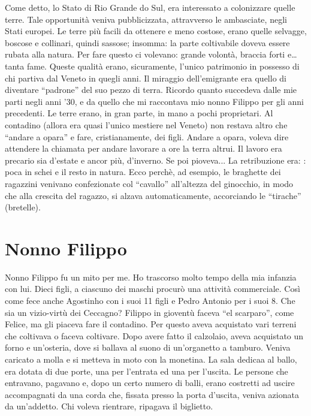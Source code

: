 \documentclass[a4paper,10pt]{book}
\begin{document}
Come detto, lo Stato di Rio Grande do Sul, era interessato a colonizzare quelle terre. Tale opportunità veniva pubblicizzata, attravverso le ambasciate, negli Stati europei.\newline
Le terre più facili da ottenere e meno costose, erano quelle selvagge, boscose e collinari, quindi sassose; insomma: la parte coltivabile doveva essere rubata alla natura. Per fare questo ci volevano: grande volontà, braccia forti e…   tanta fame. Queste qualità erano, sicuramente, l’unico patrimonio in possesso di chi partiva dal Veneto in quegli anni. Il miraggio dell’emigrante era quello di diventare “padrone” del suo pezzo di terra.\newline
Ricordo quanto succedeva dalle mie parti negli anni ’30, e da quello che mi raccontava mio nonno Filippo per gli anni precedenti. Le terre erano, in gran parte, in mano a pochi proprietari. Al contadino (allora era quasi l’unico mestiere nel Veneto) non restava altro che “andare a opara” e fare, cristianamente, dei figli. Andare a opara, voleva dire attendere la chiamata per andare lavorare a ore la terra altrui. Il lavoro era precario sia d’estate e ancor più, d’inverno. Se poi pioveva...\newline
La retribuzione era: : poca in schei e il resto in natura. Ecco perchè, ad esempio, le braghette dei ragazzini venivano confezionate col “cavallo” all’altezza del ginocchio, in modo che alla crescita del ragazzo, si alzava automaticamente, accorciando le “tirache” (bretelle).

\section*{Nonno Filippo}

Nonno Filippo fu un mito per me. Ho trascorso molto tempo della mia infanzia con lui.\newline
Dieci figli, a ciascuno dei maschi procurò una attività commerciale. Così come  fece anche Agostinho con i suoi 11 figli e Pedro Antonio per i suoi 8. Che sia un vizio-virtù dei Ceccagno?  
Filippo in gioventù faceva “el scarparo”, come Felice, ma gli piaceva fare il contadino. Per questo aveva acquistato vari terreni che coltivava o faceva coltivare. Dopo avere fatto il calzolaio, aveva acquistato un forno e un’osteria, dove si ballava al suono di un’organetto a tamburo. Veniva caricato  a molla e si metteva in moto con la monetina. La sala dedicaa al ballo, era dotata di due porte, una per l’entrata ed una per l’uscita. Le persone che entravano, pagavano e, dopo un certo numero di balli, erano costretti ad uscire accompagnati da una corda che, fissata presso la porta d’uscita, veniva azionata  da un’addetto. Chi voleva rientrare, ripagava il biglietto.
\end{document}
